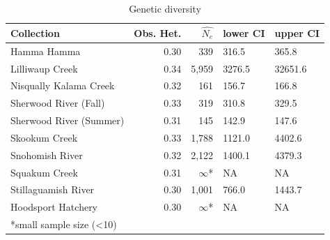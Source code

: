 \documentclass[12pt, one column]{article}
\begin{document}
\begin{table}[H]
\caption{Genetic diversity} 
\begin{tabular}{lrrll}
\toprule
Collection & Obs. Het. &  $\widehat{N_{e}}$ &   lower CI &    upper CI \\
\midrule
Hamma Hamma            &           0.30 &    339 &   316.5 &    365.8 \\
Lilliwaup Creek        &           0.34 &  5,959 &  3276.5 &  32651.6 \\
Nisqually Kalama Creek &           0.32 &    161 &   156.7 &    166.8 \\
Sherwood River (Fall)    &           0.33 &    319 &   310.8 &    329.5 \\
Sherwood River (Summer)  &           0.31 &    145 &   142.9 &    147.6 \\
Skookum Creek          &           0.33 &  1,788 &  1121.0 &   4402.6 \\
Snohomish River        &           0.32 &  2,122 &  1400.1 &   4379.3 \\
Squakum Creek          &           0.31 & $\infty$* &     NA &      NA \\
Stillaguamish River    &           0.30 &  1,001 &   766.0 &   1443.7 \\
\midrule
Hoodsport Hatchery     &           0.30 & $\infty$* &     NA &      NA \\
\bottomrule
\multicolumn{3}{l}{*small sample size (\textless10)}
\end{tabular}
\end {table}




\pagebreak
\end{document}
